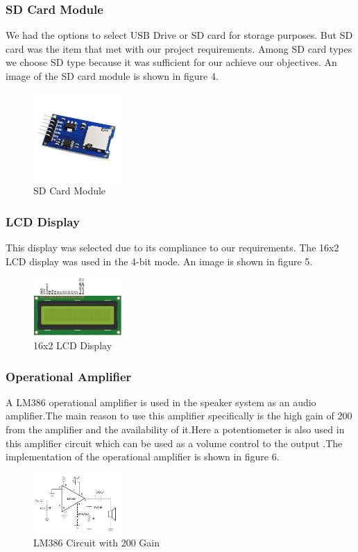 \documentclass[11pt]{article}
\begin{document}
\subsubsection{SD Card Module}
We had the options to select USB Drive or SD card for storage purposes. But SD card was the item that met with our project requirements. Among SD card types we choose SD type because it was sufficient for our achieve our objectives.
An image of the SD card module is shown in figure 4.
\begin{figure}
    \centering
    \includegraphics[width=0.3\textwidth]{Images/sd.jpg}
    \caption{SD Card Module}
\end{figure}

\subsubsection{LCD Display}
This display was selected due to its compliance to our requirements. The 16x2 LCD display was used in the 4-bit mode. An image is shown in figure 5.
\begin{figure}
    \centering
    \includegraphics[width=0.3\textwidth]{Images/lcd.jpg}
    \caption{16x2 LCD Display}
\end{figure}

\subsubsection{Operational Amplifier}
A LM386\cite{386} operational amplifier is used in the speaker system as an audio amplifier.The main reason to use this amplifier specifically is the high gain of 200 from the amplifier and the availability of it.Here a potentiometer is also used in this amplifier circuit which can be used as a volume control to the output .The implementation of the operational amplifier is shown in figure 6.
\begin{figure}
    \centering
    \includegraphics[width=0.3\textwidth]{Images/386.jpg}
    \caption{LM386 Circuit with 200 Gain}
\end{figure}
\end{document}
